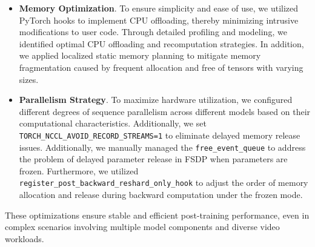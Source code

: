 \begin{itemize}
    \item \textbf{Memory Optimization}. To ensure simplicity and ease of use, we utilized PyTorch hooks to implement CPU offloading,  thereby minimizing intrusive modifications to user code. Through detailed profiling and modeling, we identified optimal CPU offloading and recomputation strategies. In addition, we applied localized static memory planning to mitigate memory fragmentation caused by frequent allocation and free of tensors with varying sizes. 
    \item \textbf{Parallelism Strategy}. To maximize hardware utilization, we configured different degrees of sequence parallelism across different models based on their computational characteristics. Additionally, we set \texttt{TORCH\_NCCL\_AVOID\_RECORD\_STREAMS=1} to eliminate delayed memory release issues. Additionally, we manually managed the \texttt{free\_event\_queue} to address the problem of delayed parameter release in FSDP when parameters are frozen. Furthermore, we utilized \texttt{register\_post\_backward\_reshard\_only\_hook} to adjust the order of memory allocation and release during backward computation under the frozen mode.
\end{itemize}

These optimizations ensure stable and efficient post-training performance, even in complex scenarios involving multiple model components and diverse video workloads.




